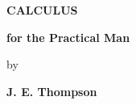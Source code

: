 \documentclass[openany]{book}
\begin{document}
\begin{titlepage}
    \centering
    \vspace*{2cm}
    
    {\Huge\bfseries CALCULUS\par}
    \vspace{0.5cm}
    {\Large\bfseries for the Practical Man\par}
    \vspace{2cm}
    
    {\Large by\par}
    \vspace{1cm}
    
    {\Large\bfseries J. E. Thompson\par}
    
    \vfill
\end{titlepage}

\tableofcontents
\clearpage
\listoffigures






\end{document}
